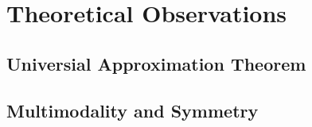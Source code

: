 \documentclass[./\jobname.tex]{subfiles}
\begin{document}
\chapter{Theoretical Observations}

\section{Universial Approximation Theorem}
\label{chap:gsin_approximation_theorem}

\section{Multimodality and Symmetry}
\end{document}
